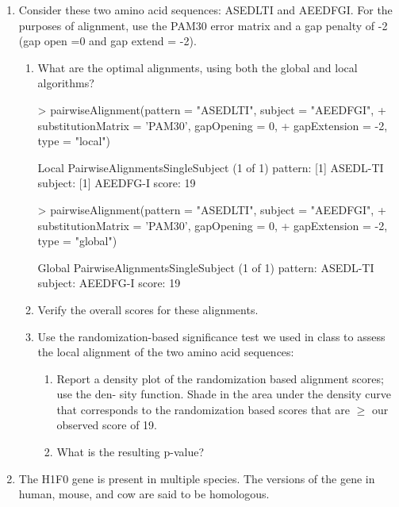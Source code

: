\documentclass[12pt,a4paper]{paper}
\begin{document}
\begin{enumerate}
\begin{enumerate}
\end{enumerate}
\item Consider these two amino acid sequences: ASEDLTI and AEEDFGI. For the purposes of alignment, use the PAM30 error matrix and a gap penalty of -2 (gap open =0 and gap extend = -2).
\begin{enumerate}
\item What are the optimal alignments, using both the global and local algorithms?
\begin{Schunk}
\begin{Sinput}
> pairwiseAlignment(pattern = "ASEDLTI", subject = "AEEDFGI",
+                   substitutionMatrix = 'PAM30', gapOpening = 0, 
+                   gapExtension = -2, type = "local")
\end{Sinput}
\begin{Soutput}
Local PairwiseAlignmentsSingleSubject (1 of 1)
pattern: [1] ASEDL-TI
subject: [1] AEEDFG-I
score: 19 
\end{Soutput}
\begin{Sinput}
> pairwiseAlignment(pattern = "ASEDLTI", subject = "AEEDFGI",
+                   substitutionMatrix = 'PAM30', gapOpening = 0, 
+                   gapExtension = -2, type = "global")
\end{Sinput}
\begin{Soutput}
Global PairwiseAlignmentsSingleSubject (1 of 1)
pattern: ASEDL-TI
subject: AEEDFG-I
score: 19 
\end{Soutput}
\end{Schunk}
\item Verify the overall scores for these alignments.
\item Use the randomization-based significance test we used in class to assess the local alignment of the two amino acid sequences:
\begin{enumerate}
\item Report a density plot of the randomization based alignment scores; use the den- sity function. Shade in the area under the density curve that corresponds to the randomization based scores that are $\ge$ our observed score of 19.
\item What is the resulting p-value?
\end{enumerate}
\end{enumerate}
\item The H1F0 gene is present in multiple species. The versions of the gene in human, mouse, and cow are said to be homologous.
\begin{Schunk}
\begin{Sinput}

\end{Sinput}
\end{Schunk}
\end{enumerate}
\end{document}
